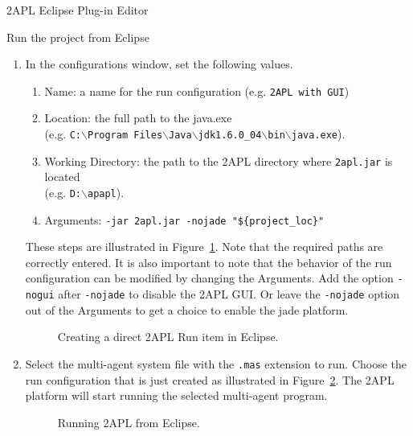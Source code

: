 \begin{chapter}{2APL Eclipse Plug-in Editor}
\begin{section}{Run the project from Eclipse}
\begin{enumerate}
    \item In the configurations window, set the following values.
        \begin{enumerate}
        \item Name: a name for the run configuration (e.g. \texttt{2APL with GUI})

        \item Location: the full path to the java.exe\\
        (e.g. \texttt{C:$\backslash$Program
        Files$\backslash$Java$\backslash$jdk1.6.0\_04$\backslash$bin$\backslash$java.exe}).

        \item Working Directory: the path to the 2APL directory where {\tt 2apl.jar} is
        located\\
        (e.g. \texttt{D:$\backslash$apapl}).

        \item Arguments: \texttt{-jar 2apl.jar -nojade "\$\{project\_loc\}"}
        \end{enumerate}

        These steps are illustrated in Figure~\ref{fig:platform}.
        Note that the required paths are correctly entered. It is also important to note that
        the behavior of the run configuration can be modified by changing the
        Arguments. Add the option \texttt{-nogui} after \texttt{-nojade} to
        disable the 2APL GUI. Or leave the \texttt{-nojade} option out of the
        Arguments to get a choice to enable the jade platform.
        \begin{figure}[ht]
                \begin{center}
                \end{center}
                \caption{Creating a direct 2APL Run item in Eclipse.}\label{fig:platform}
            \end{figure}

    \item Select the multi-agent system file with the \texttt{.mas} extension to run.
    Choose the run configuration that is just created as illustrated in
    Figure~\ref{fig:run}. The 2APL platform will start running the selected multi-agent program.
        \begin{figure}[ht]
            \begin{center}
            \end{center}
            \caption{Running 2APL from Eclipse.}\label{fig:run}
        \end{figure}

    \end{enumerate}
\end{section}
\end{chapter}

